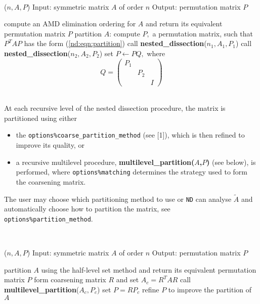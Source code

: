 \noindent\hrulefill\\
\vspace{-1.0em}
\begin{algorithmic}
($n,A,P$)
\STATE Input: symmetric matrix $A$ of order $n$
\STATE Output: permutation matrix $P$

\STATE compute an AMD elimination ordering for $A$ and return its equivalent 
permutation matrix $P$ 
\ELSE
\STATE partition $A$: compute $P,$ a permutation matrix, such that $P^T A P$ 
has the form (\ref{nd:eqn:partition})
\STATE call {\bf nested\_dissection}($n_1,A_1,P_1$)
\STATE call {\bf nested\_dissection}($n_2,A_2,P_2$)
\STATE set $P \leftarrow PQ,$ where $$Q = \left( \begin{array}{ccc} P_1 & & \\ & P_2 & \\ & & I  \end{array} \right)$$
\ENDIF

\end{algorithmic}
\noindent\hrulefill\\

At each recursive level of the nested dissection procedure, the matrix is 
partitioned using either 
\begin{itemize}
\item the {\tt options\%coarse\_partition\_method} (see [1]), which is then refined to improve its 
quality, or 
\item a recursive multilevel procedure,  \textbf{multilevel\_partition($A$,$P$)} (see below), 
is performed, where \texttt{options\%matching} determines the strategy used to form 
the coarsening matrix.
\end{itemize}
The user may choose which partitioning method to use or {\tt ND} can analyse 
$\widetilde{A}$ and automatically choose how to partition the matrix, see 
\texttt{options\%partition\_method}.

\vspace{0.5cm}
\noindent\hrulefill\\
\vspace{-1.0em}
\begin{algorithmic}
($n,A,P$)
\STATE Input: symmetric matrix $A$ of order $n$
\STATE Output: permutation matrix $P$

\STATE partition $A$ using the half-level set method and return its equivalent permutation matrix $P$ 
\ELSE
\STATE form coarsening matrix $R$ and set $A_c = R^T A R$
\STATE call {\bf multilevel\_partition}($A_c,P_c$)
\STATE set $P = RP_c$
\STATE refine $P$ to improve the partition of $A$
\ENDIF

\end{algorithmic}
\noindent\hrulefill


